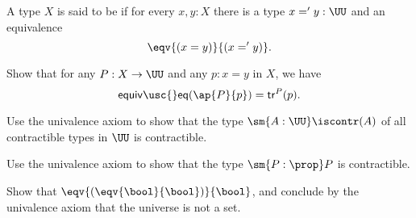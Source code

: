 \begin{defn}
A type $X$ is said to be  if for every $x,y:X$ there is a type $x='y:\UU$ and an equivalence
\begin{equation*}
\eqv{(x=y)}{(x='y)}.
\end{equation*}
\end{defn}

\begin{exercises}
\item \label{ex:tr_ap} Show that for any $P:X\to \UU$ and any $p:x=y$ in $X$, we have
\begin{equation*}
\mathsf{equiv\usc{}eq}(\ap{P}{p})=\mathsf{tr}^P(p).
\end{equation*}
\item Use the univalence axiom to show that the type $\sm{A:\UU}\iscontr(A)$ of all contractible types in $\UU$ is contractible.
\item Use the univalence axiom to show that the type $\sm{P:\prop}P$ is contractible.
\item Show that $\eqv{(\eqv{\bool}{\bool})}{\bool}$, and conclude by the univalence axiom that the universe is not a set.
\end{exercises}
